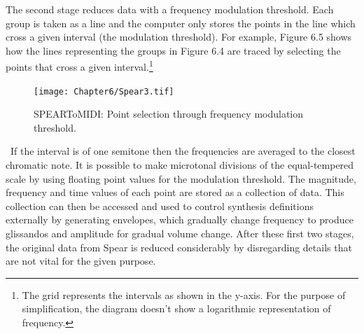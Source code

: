 The second stage reduces data with a frequency modulation threshold. Each group is taken as a line and the computer only stores the points in the line which cross a given interval (the modulation threshold). For example, Figure 6.5 shows how the lines representing the groups in Figure 6.4 are traced by selecting the points that cross a given interval.\footnote{The grid represents the intervals as shown in the y-axis. For the purpose of simplification, the diagram doesn't show a logarithmic representation of frequency.} 
\begin{figure}[htbp] %
   \centering
   \texttt{[image: Chapter6/Spear3.tif]} %
   \caption{SPEARToMIDI: Point selection through frequency modulation threshold.}
   \label{fig:example}
\end{figure}\
If the interval is of one semitone then the frequencies are averaged to the closest chromatic note. It is possible to make microtonal divisions of the equal-tempered scale by using floating point values for the modulation threshold. The magnitude, frequency and time values of each point are stored as a collection of data. This collection can then be accessed and used to control synthesis definitions externally by generating envelopes, which gradually change frequency to produce glissandos and amplitude for gradual volume change. After these first two stages, the original data from Spear is reduced considerably by disregarding details that are not vital for the given purpose. 

